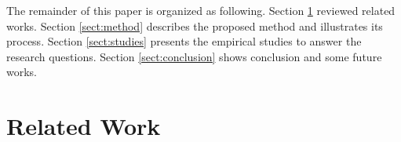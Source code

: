 \documentclass[conference]{IEEEtran}
\begin{document}
The remainder of this paper is organized as following.
%
Section \ref{sect:relatedworks} reviewed related works.
%
Section \ref{sect:method} describes the proposed method and illustrates
its process.
%
Section \ref{sect:studies} presents the empirical studies to answer the
research questions.
%
Section \ref{sect:conclusion} shows conclusion and some future works.



\section{Related Work}\label{sect:relatedworks}
\end{document}
